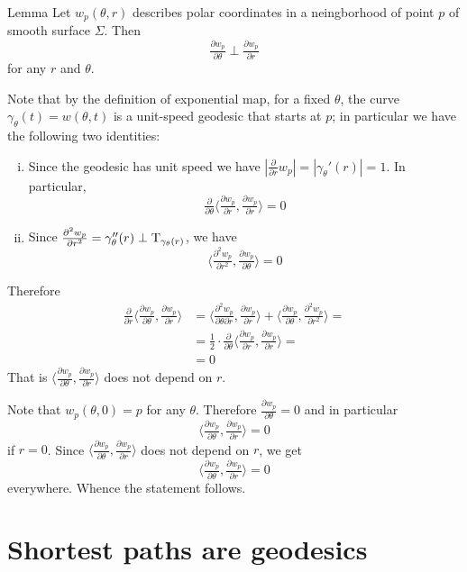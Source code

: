 \begin{thm}{Lemma}\label{lem:palar-perp}
Let $w_p(\theta,r)$ describes polar coordinates in a neingborhood of point $p$ of smooth surface $\Sigma$.
Then
\[\tfrac{\partial w_p}{\partial\theta}\perp\tfrac{\partial w_p}{\partial r}\]
for any $r$ and $\theta$.
\end{thm}

Note that by the definition of exponential map, for a fixed $\theta$, the curve $\gamma_\theta(t)=w(\theta,t)$ is a unit-speed geodesic that starts at $p$;
in particular we have the following two identities:
\begin{enumerate}[(i)]
\item Since the geodesic has unit speed we have $|\tfrac{\partial}{\partial r}w_p|=|\gamma_\theta'(r)|=1$. In particular,
 \[\tfrac{\partial}{\partial \theta}\langle\tfrac{\partial w_p}{\partial r},\tfrac{\partial w_p}{\partial r}\rangle=0\]
\item Since $\tfrac{\partial^2w_p}{\partial r^2}=\gamma''_\theta(r)\perp\mathrm{T}_{\gamma_\theta(r)}$, we have 
\[\langle\tfrac{\partial^2w_p}{\partial r^2},\tfrac{\partial w_p}{\partial \theta}\rangle=0\]
\end{enumerate}
Therefore
\begin{align*}
\tfrac{\partial}{\partial r}
\langle\tfrac{\partial w_p}{\partial\theta},\tfrac{\partial w_p}{\partial r}\rangle
&=\langle\tfrac{\partial^2 w_p}{\partial\theta\partial r},\tfrac{\partial w_p}{\partial r}\rangle
+
\langle\tfrac{\partial w_p}{\partial\theta},\tfrac{\partial^2 w_p}{\partial r^2}\rangle=
\\
&=\tfrac12\cdot \tfrac{\partial}{\partial \theta}\langle\tfrac{\partial w_p}{\partial r},\tfrac{\partial w_p}{\partial r}\rangle=
\\
&=0
\end{align*}
That is $\langle\tfrac{\partial w_p}{\partial\theta},\tfrac{\partial w_p}{\partial r}\rangle$ does not depend on $r$.

Note that $w_p(\theta,0)=p$ for any $\theta$.
Therefore
$\tfrac{\partial w_p}{\partial\theta}=0$
and in particular 
\[\langle\tfrac{\partial w_p}{\partial\theta},\tfrac{\partial w_p}{\partial r}\rangle=0\]
if $r=0$.
Since $\langle\tfrac{\partial w_p}{\partial\theta},\tfrac{\partial w_p}{\partial r}\rangle$ does not depend on $r$, 
we get 
\[\langle\tfrac{\partial w_p}{\partial\theta},\tfrac{\partial w_p}{\partial r}\rangle=0\]
everywhere.
Whence the statement follows.
\qeds

\section*{Shortest paths are geodesics}


